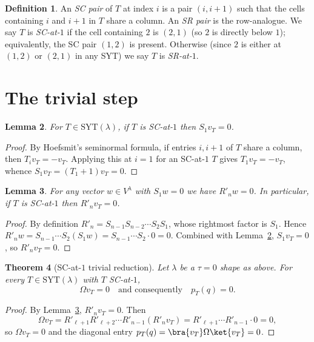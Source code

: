 \documentclass[11pt]{article}
\newtheorem{theorem}{Theorem}
\newtheorem{lemma}[theorem]{Lemma}
\theoremstyle{definition}
\newtheorem{definition}[theorem]{Definition}
\newcommand{\la}{\lambda}
\newcommand{\Om}{\Omega}
\newcommand{\vT}{v_T}
\begin{document}
\begin{definition}
An \emph{SC pair} of $T$ at index $i$ is a pair $(i, i+1)$ such that
the cells containing $i$ and $i+1$ in $T$ share a column. An
\emph{SR pair} is the row-analogue. We say $T$ is \emph{SC-at-$1$} if
the cell containing $2$ is $(2, 1)$ (so $2$ is directly below $1$);
equivalently, the SC pair $(1, 2)$ is present. Otherwise (since $2$ is
either at $(1, 2)$ or $(2, 1)$ in any SYT) we say $T$ is
\emph{SR-at-$1$}.
\end{definition}

\section{The trivial step}

\begin{lemma}\label{lem:S1-kills}
For $T \in \mathrm{SYT}(\la)$, if $T$ is SC-at-$1$ then
$S_1 \vT = 0$.
\end{lemma}

\begin{proof}
By Hoefsmit's seminormal formula, if entries $i, i+1$ of $T$ share a
column, then $T_i \vT = -\vT$. Applying this at $i = 1$ for an SC-at-$1$
$T$ gives $T_1 \vT = -\vT$, whence $S_1 \vT = (T_1 + 1)\vT = 0$.
\end{proof}

\begin{lemma}\label{lem:Rn-kills}
For any vector $w \in V^\la$ with $S_1 w = 0$ we have $R'_n w = 0$. In
particular, if $T$ is SC-at-$1$ then $R'_n \vT = 0$.
\end{lemma}

\begin{proof}
By definition $R'_n = S_{n-1} S_{n-2} \cdots S_2 S_1$, whose rightmost
factor is $S_1$. Hence
$R'_n w = S_{n-1} \cdots S_2 (S_1 w) = S_{n-1} \cdots S_2 \cdot 0 = 0$.
Combined with Lemma~\ref{lem:S1-kills}, $S_1 \vT = 0$, so
$R'_n \vT = 0$.
\end{proof}

\begin{theorem}[SC-at-$1$ trivial reduction]\label{thm:main}
Let $\la$ be a $\tau = 0$ shape as above. For every
$T \in \mathrm{SYT}(\la)$ with $T$ SC-at-$1$,
\[
\Om \vT = 0
\quad\text{and consequently}\quad
p_T(q) = 0.
\]
\end{theorem}

\begin{proof}
By Lemma~\ref{lem:Rn-kills}, $R'_n \vT = 0$. Then
\[
\Om \vT = R'_{\ell+1} R'_{\ell+2} \cdots R'_{n-1} (R'_n \vT)
= R'_{\ell+1} \cdots R'_{n-1} \cdot 0 = 0,
\]
so $\Om \vT = 0$ and the diagonal entry
$p_T(q) = \bra{\vT}\Om\ket{\vT} = 0$.
\end{proof}
\end{document}
